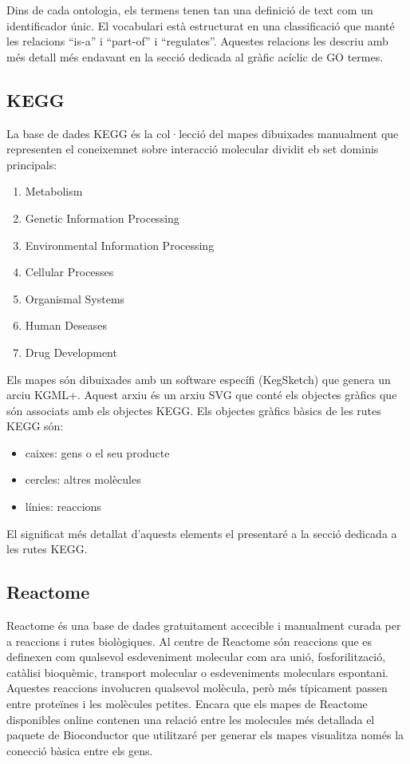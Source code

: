 Dins de cada ontologia, els termens tenen tan una definició de text com un identificador únic. El vocabulari està estructurat en una classificació que manté les relacions ``is-a'' i ``part-of'' i ``regulates''. Aquestes relacions les descriu amb més detall més endavant en la secció dedicada al gràfic acíclic de GO termes.

\subsection{KEGG}
La base de dades KEGG és la col·lecció del mapes dibuixades manualment que representen el coneixemnet sobre interacció molecular dividit eb set dominis principals:
\begin{enumerate}
\item Metabolism
\item Genetic Information Processing
\item Environmental Information Processing
\item Cellular Processes
\item Organismal Systems
\item Human Deseases
\item Drug Development
\end{enumerate}

Els mapes són dibuixades amb un software específi (KegSketch) que genera un arciu KGML+. Aquest arxiu és un arxiu SVG que conté els objectes gràfics que són associats amb els objectes KEGG. Els objectes gràfics bàsics de les rutes KEGG són:
\begin{itemize}
\item caixes: gens o el seu producte
\item cercles: altres molècules
\item línies: reaccions
\end{itemize}
 
El significat més detallat d'aquests elements el presentaré a la secció dedicada a les rutes KEGG.

\subsection{Reactome}

Reactome és una base de dades gratuitament accecible i manualment curada per a reaccions i rutes biològiques. Al centre de Reactome són reaccions que es definexen com qualsevol esdeveniment molecular com ara unió, fosforilització, catàlisi bioquèmic, transport molecular o esdeveniments moleculars espontani. Aquestes reaccions involucren qualsevol molècula, però més típicament passen entre proteïnes i les molècules petites. Encara que els mapes de Reactome disponibles online contenen una relació entre les molecules més detallada el paquete de Bioconductor que utilitzaré per generar els mapes visualitza només la conecció bàsica entre els gens. 

